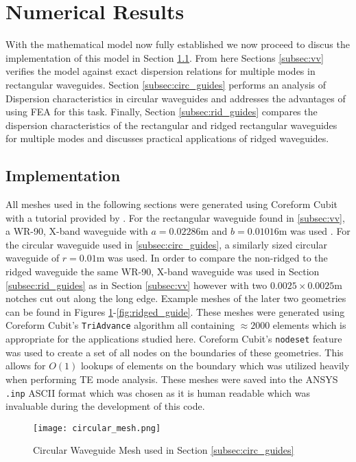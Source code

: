 \section{Numerical Results}
\label{sec:numres}
With the mathematical model now fully established we now proceed to discus the implementation of this model in Section \ref{subsec:impl}. From here Sections \ref{subsec:vv} verifies the model against exact dispersion relations for multiple modes in rectangular waveguides. Section \ref{subsec:circ_guides} performs an analysis of Dispersion characteristics in circular waveguides and addresses the advantages of using FEA for this task. Finally, Section \ref{subsec:rid_guides} compares the dispersion characteristics of the rectangular and ridged rectangular waveguides for multiple modes and discusses practical applications of ridged waveguides.

\subsection{Implementation}
\label{subsec:impl}
All meshes used in the following sections were generated using Coreform Cubit \cite{cubit} with a tutorial provided by \cite{rothlecnotes}. For the rectangular waveguide found in \ref{subsec:vv}, a WR-90, X-band waveguide with $a=0.02286$m and $b=0.01016$m was used \cite{everythingrf}. For the circular waveguide used in \ref{subsec:circ_guides}, a similarly sized circular waveguide of $r=0.01$m was used. In order to compare the non-ridged to the ridged waveguide the same WR-90, X-band waveguide was used in Section \ref{subsec:rid_guides} as in Section \ref{subsec:vv} however with two $0.0025\times0.0025$m notches cut out along the long edge. Example meshes of the later two geometries can be found in Figures \ref{fig:circular_guide}-\ref{fig:ridged_guide}. These meshes were generated using Coreform Cubit's \verb|TriAdvance| algorithm all containing $\approx2000$ elements which is appropriate for the applications studied here. Coreform Cubit's \verb|nodeset| feature was used to create a set of all nodes on the boundaries of these geometries. This allows for $O(1)$ lookups of elements on the boundary which was utilized heavily when performing TE mode analysis. These meshes were saved into the ANSYS \verb|.inp| ASCII format which was chosen as it is human readable which was invaluable during the development of this code.

\begin{figure}[h!]  
	\centering
	\texttt{[image: circular\_mesh.png]} 
	\caption{Circular Waveguide Mesh used in Section \ref{subsec:circ_guides}}
	\label{fig:circular_guide}
\end{figure}

